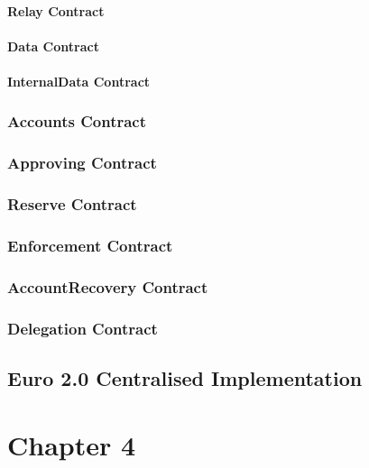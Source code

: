 \documentclass[12pt]{article} %
\begin{document}
{{\paragraph{Relay Contract}

\paragraph{Data Contract}

\paragraph{InternalData Contract}

\subsubsection{Accounts Contract} \label{sssec:3.5:accounts}
\subsubsection{Approving Contract} \label{sssec:3.5:approving}
\subsubsection{Reserve Contract} \label{sssec:3.5:reserve}
\subsubsection{Enforcement Contract} \label{sssec:3.5:enforcement}
\subsubsection{AccountRecovery Contract} \label{sssec:3.5:accountRecovery}
\subsubsection{Delegation Contract} \label{sssec:3.5:delegation}

\subsection{Euro 2.0 Centralised Implementation} \label{ssec:3.5}

\pagebreak

\section{Chapter 4} \label{sec:4}

}}
\end{document}

